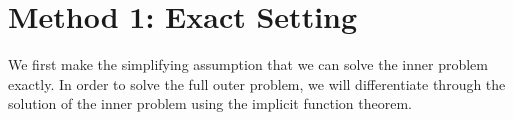 \documentclass[11pt]{article}
\begin{document}
\section{Method 1: Exact Setting}
We first make the simplifying assumption that we can solve the inner problem exactly.
In order to solve the full outer problem, we will differentiate through the solution of the
inner problem using the implicit function theorem.




\end{document}
